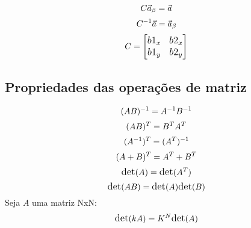 \begin{equation*}
\large C \vec{a}_\beta = \vec{a}
\end{equation*} 
\begin{equation*}
\large C^{-1} \vec{a} = \vec{a}_\beta
\end{equation*} 
\begin{equation*} 
\large
C = 
\begin{bmatrix}
    b1_x & b2_x \\
    b1_y & b2_y
\end{bmatrix}
\end{equation*}


\subsection{Propriedades das operações de matriz}

\begin{equation*} 
\large (AB)^{-1} = A^{-1}B^{-1}\\
\end{equation*}
\begin{equation*} 
\large (AB)^{T} = B^{T}A^{T} \\
\end{equation*}
\begin{equation*} 
\large (A^{-1})^{T} = (A^{T})^{-1} \\
\end{equation*}
\begin{equation*} 
\large (A+B)^{T} = A^{T} + B^{T} \\
\end{equation*}
\begin{equation*} 
\large \text{det}(A) = \text{det}(A^{T}) \\
\end{equation*}
\begin{equation*} 
\large \text{det}(AB) = \text{det}(A)\text{det}(B) \\
\end{equation*}
{\large Seja $A$ uma matriz NxN:}
\begin{equation*} 
\large \text{det}(kA) = K^N\text{det}(A) \\
\end{equation*}
